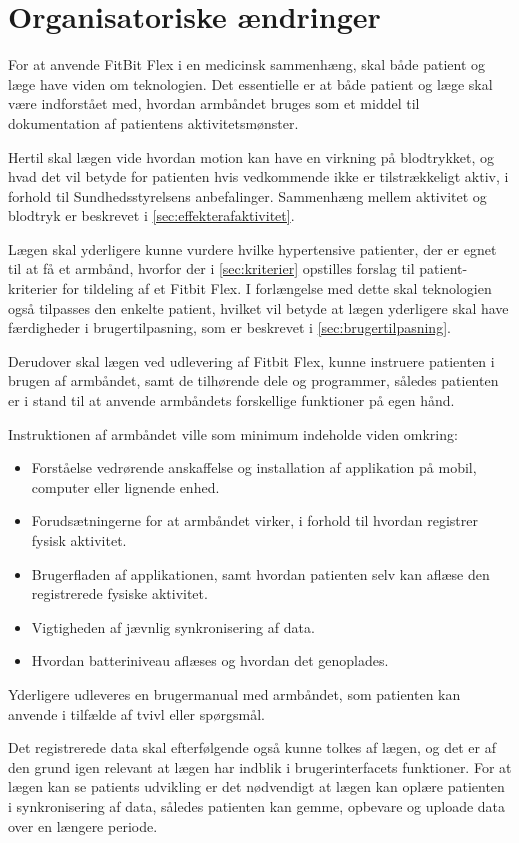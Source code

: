 \section{Organisatoriske ændringer}\label{sec:org_aendringer}

For at anvende FitBit Flex i en medicinsk sammenhæng, skal både patient og læge have viden om teknologien. Det essentielle er at både patient og læge skal være indforstået med, hvordan armbåndet bruges som et middel til dokumentation af patientens aktivitetsmønster.

Hertil skal lægen vide hvordan motion kan have en virkning på blodtrykket, og hvad det vil betyde for patienten hvis vedkommende ikke er tilstrækkeligt aktiv, i forhold til Sundhedsstyrelsens anbefalinger. Sammenhæng mellem aktivitet og blodtryk er beskrevet i \autoref{sec:effekterafaktivitet}.

Lægen skal yderligere kunne vurdere hvilke hypertensive patienter, der er egnet til at få et armbånd, hvorfor der i \autoref{sec:kriterier} opstilles forslag til patient-kriterier for tildeling af et Fitbit Flex. I forlængelse med dette skal teknologien også tilpasses den enkelte patient, hvilket vil betyde at lægen yderligere skal have færdigheder i brugertilpasning, som er beskrevet i \autoref{sec:brugertilpasning}. 

Derudover skal lægen ved udlevering af Fitbit Flex, kunne instruere patienten i brugen af armbåndet, samt de tilhørende dele og programmer, således patienten er i stand til at anvende armbåndets forskellige funktioner på egen hånd. 

Instruktionen af armbåndet ville som minimum indeholde viden omkring: 
\begin{itemize}
\item Forståelse vedrørende anskaffelse og installation af applikation på mobil, computer eller lignende enhed. 
\item Forudsætningerne for at armbåndet virker, i forhold til hvordan registrer fysisk aktivitet. 
\item Brugerfladen af applikationen, samt hvordan patienten selv kan aflæse den registrerede fysiske aktivitet.  
\item Vigtigheden af jævnlig synkronisering af data. 
\item Hvordan batteriniveau aflæses og hvordan det genoplades. 
\end{itemize} 

Yderligere udleveres en brugermanual med armbåndet, som patienten kan anvende i tilfælde af tvivl eller spørgsmål.   

Det registrerede data skal efterfølgende også kunne tolkes af lægen, og det er af den grund igen relevant at lægen har indblik i brugerinterfacets funktioner. For at lægen kan se patients udvikling er det nødvendigt at lægen kan oplære patienten i synkronisering af data, således patienten kan gemme, opbevare og uploade data over en længere periode.

